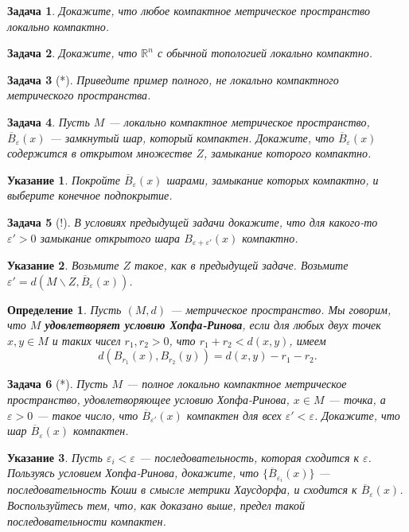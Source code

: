 \documentclass[12pt]{book}
\renewcommand{\epsilon}{\varepsilon}
\def\R{{\mathbb R}}
\theoremstyle{upshape}
\newtheorem{zadacha}{Задача}[chapter]
\theoremstyle{generic}
\newtheorem{opredelenie}[teorema]{Определение}
\newtheorem{remark}[teorema]{Замечание}
\def\замечание{\begin{remark}}
\def\еза{\end{remark}}
\theoremstyle{upshapenonumber}
\newtheorem{ukazanie}{Указание}[section]
\newcommand{\следствие}{%
     \refstepcounter{teorema}
     {\noindent\bf Следствие \thechapter.\arabic{teorema}:\ }}
\newcommand{\пример}{%
     \refstepcounter{teorema}
     {\noindent\bf Пример \thechapter.\arabic{teorema}:\ }}
\newcommand{\лемма}{%
     \refstepcounter{teorema}
     {\noindent\bf Лемма \thechapter.\arabic{teorema}:\ }}
\newcommand{\теорема}{%
     \refstepcounter{teorema}
     {\noindent\bf Теорема \thechapter.\arabic{teorema}:\ }}
\newcommand{\утверждение}{%
     \refstepcounter{teorema}
     {\noindent\bf Утверждение \thechapter.\arabic{teorema}:\ }}
\def\ем{\em}
\def\задача{\begin{zadacha}}
\def\ез{\end{zadacha}}
\def\еу{\end{ukazanie}}
\def\ео{\end{opredelenie}}
\def\енум{\begin{enumerate}}
\def\ее{\end{enumerate}}
\begin{document}
{\задача
Докажите, что любое компактное метрическое пространство локально компактно.
\ез

\задача
Докажите, что $\R^n$ с обычной топологией локально компактно.
\ез

\задача[*]
Приведите пример полного, не локально компактного метрического
пространства.
\ез


\begin{zadacha}  Пусть $M$ --- локально компактное
метрическое пространство, $\overline{B}_\epsilon(x)$ --- замкнутый
шар, который компактен. Докажите, что $\overline{B}_\epsilon(x)$
содержится в открытом множестве $Z$, замыкание которого компактно.
\end{zadacha}

\begin{ukazanie} Покройте $\overline B_\epsilon(x)$ шарами,
замыкание которых компактно, и выберите конечное подпокрытие.
\end{ukazanie}

\begin{zadacha}[!] В условиях предыдущей задачи
докажите, что для какого-то $\epsilon'> 0$ замыкание
  открытого шара
${B}_{\epsilon+\epsilon'}(x)$ компактно.
\end{zadacha}

\begin{ukazanie} Возьмите $Z$ такое, как в предыдущей задаче. Возьмите
$\epsilon' = d (M \backslash Z, \overline B_\epsilon(x))$.
\end{ukazanie}

\begin{opredelenie} Пусть $(M, d)$ --- метрическое пространство.
Мы говорим, что $M$ {\bf удовлетворяет условию Хопфа-Ринова}, если
для любых двух точек $x, y\in M$ и таких чисел $r_1, r_2 >0$, что
$r_1+r_2 < d(x,y)$, имеем
$$
d(B_{r_1}(x), B_{r_2}(y)) = d(x,y) -r_1-r_2.
$$
\end{opredelenie}

\begin{zadacha}[*] Пусть $M$ --- полное локально компактное 
метрическое пространство, удовлетворяющее условию Хопфа-Ринова,
$x\in M$ --- точка, а $\epsilon>0$ --- такое число, что $\overline
B_{\epsilon'}(x)$ компактен для всех $\epsilon'<\epsilon$.
Докажите, что шар $\overline B_{\epsilon}(x)$ компактен.
\end{zadacha}

\begin{ukazanie} Пусть $\epsilon_i<\epsilon$ --- последовательность,
которая сходится к $\epsilon$. Пользуясь условием Хопфа-Ринова,
докажите, что $\{\overline B_{\epsilon_i}(x)\}$ --- последовательность
Коши в смысле метрики Хаусдорфа, и сходится к $\overline
B_{\epsilon}(x)$.  Воспользуйтесь тем, что, как доказано выше,
предел такой последовательности компактен.
\end{ukazanie}

}
\end{document}
